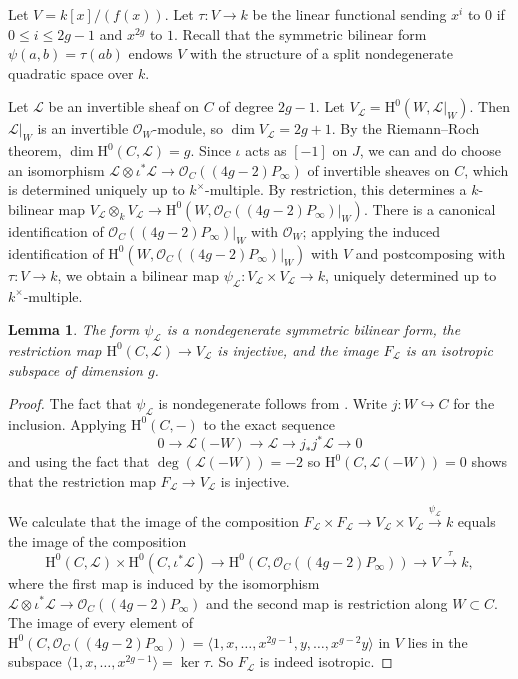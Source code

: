\documentclass{article} %
\newtheorem{lemma}[proposition]{Lemma}
\numberwithin{equation}{section}
\newcommand{\sh}[1]{\mathscr{#1}}
\renewcommand{\O}{\mathcal{O}}
\newcommand{\HH}{\mathrm{H}}
\newcommand{\cO}{\mathcal{O}}
\begin{document}
Let $V = k[x] / (f(x))$. Let $\tau\colon V\rightarrow k$ be the linear functional sending $x^i$ to $0$ if $0\leq i \leq 2g-1$ and $x^{2g}$ to $1$.
Recall that the symmetric bilinear form $\psi(a,b)= \tau(ab)$ endows $V$ with the structure of a  split nondegenerate quadratic space over $k$.

Let $\sh{L}$ be an invertible sheaf on $C$ of degree $2g-1$.
Let $V_{\sh{L}} = \HH^0(W, \sh{L}|_W)$.
Then $\sh{L}|_W$ is an invertible $\O_W$-module, so $\dim V_{\sh{L}} = 2g+1$.
By the  Riemann--Roch theorem, $\dim \HH^0(C, \sh{L}) =g$. Since $\iota$ acts as $[-1]$ on $J$, we can and do choose an isomorphism $\sh{L}\otimes \iota^* \sh{L} \rightarrow \O_C((4g-2)P_{\infty})$ of invertible sheaves on $C$, which is determined uniquely up to $k^\times$-multiple.  By restriction, this determines a $k$-bilinear map $V_\sh{L} \otimes_k V_\sh{L} \to \HH^0(W, \O_C((4g-2)P_{\infty})|_W)$.
There is a canonical identification of $\O_C((4g-2)P_\infty)|_W$ with $\cO_W$; applying the induced identification of $\HH^0(W, \O_C((4g-2)P_\infty)|_W)$ with $V$ and postcomposing with $\tau\colon V\rightarrow k$, we obtain a bilinear map $\psi_{\sh{L}} : V_{\sh{L}} \times V_{\sh{L}} \rightarrow k$, uniquely determined up to $k^{\times}$-multiple.
\begin{lemma}\label{lem_space_of_sections_is_isotropic}
    The form $\psi_{\sh{L}}$ is a nondegenerate symmetric bilinear form, the restriction map $\HH^0(C, \sh{L}) \rightarrow V_{\sh{L}}$ is injective, and the image $F_{\sh{L}}$ is an isotropic subspace of dimension $g$. 
\end{lemma}
\begin{proof}
    The fact that $\psi_{\sh{L}}$ is nondegenerate follows from \cite[Lemma 2.6]{Thorne-remark}.
    Write $j\colon W \hookrightarrow C$ for the inclusion. Applying $\HH^0(C,-)$ to the exact sequence  
    \[
    0\rightarrow \sh{L}(-W) \rightarrow \sh{L}\rightarrow j_*j^*\sh{L}\rightarrow 0
    \]
    and using the fact that $\deg(\sh{L}(-W)) = -2$ so $\HH^0(C, \sh{L}(-W)) = 0$ shows that the restriction map $F_\sh{L}\rightarrow V_{\sh{L}}$ is injective.

    We calculate that the image of the composition $F_{\sh{L}}\times F_{\sh{L}} \rightarrow V_{\sh{L}} \times V_{\sh{L}} \xrightarrow{\psi_{\sh{L}}} k$ equals the image of the composition
    \[
    \HH^0(C, \sh{L}) \times \HH^0(C, \iota^*\sh{L})
    \rightarrow \HH^0(C,\O_C((4g-2)P_{\infty})) \rightarrow V\xrightarrow{\tau}k,
    \]
    where the first map is induced by the isomorphism $\sh{L}\otimes \iota^*\sh{L}\rightarrow \O_C((4g-2)P_{\infty})$ and the second map is restriction along $W\subset C$.
    The image of every element of $\HH^0(C, \O_C((4g-2)P_\infty)) = \langle 1, x, \dots, x^{2g-1}, y, \dots, x^{g-2}y\rangle$ in $V$ lies in the subspace $\langle 1, x, \dots, x^{2g-1}\rangle = \ker \tau$. So $F_{\sh{L}}$ is indeed isotropic.
\end{proof}
\end{document}
